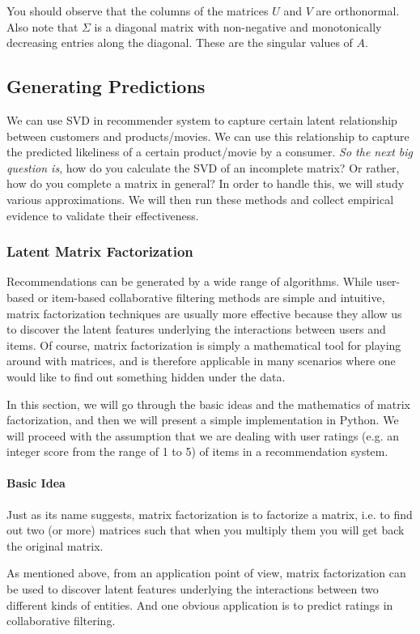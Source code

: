 You should observe that the columns of the matrices $U$ and $V$ are orthonormal. Also note that $\Sigma$ is a diagonal matrix with non-negative and monotonically decreasing entries along the diagonal. These are the singular values of $A$.
  \subsection{Generating Predictions}
  We can use SVD in recommender system to capture certain latent relationship between customers and products/movies. We can use this relationship to capture the predicted likeliness of a certain product/movie by a consumer. \textit{So the next big question is}, how do you calculate the SVD of an incomplete matrix? Or rather, how do you complete a matrix in general? In order to handle this, we will study various approximations. We will then run these methods and collect empirical evidence to validate their effectiveness.
  \subsubsection{Latent Matrix Factorization}

Recommendations can be generated by a wide range of algorithms. While user-based or item-based collaborative filtering methods are simple and intuitive, matrix factorization techniques are usually more effective because they allow us to discover the latent features underlying the interactions between users and items. Of course, matrix factorization is simply a mathematical tool for playing around with matrices, and is therefore applicable in many scenarios where one would like to find out something hidden under the data.

In this section, we will go through the basic ideas and the mathematics of matrix factorization, and then we will present a simple implementation in Python. We will proceed with the assumption that we are dealing with user ratings (e.g. an integer score from the range of 1 to 5) of items in a recommendation system.
\paragraph{Basic Idea}
Just as its name suggests, matrix factorization is to factorize a matrix, i.e. to find out two (or more) matrices such that when you multiply them you will get back the original matrix.

As mentioned above, from an application point of view, matrix factorization can be used to discover latent features underlying the interactions between two different kinds of entities. And one obvious application is to predict ratings in collaborative filtering.

